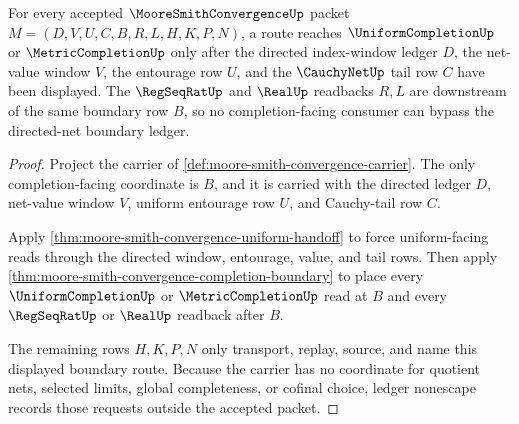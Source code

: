 \begin{theorem}
\label{thm:moore-smith-convergence-boundary-scope}
For every accepted $\MooreSmithConvergenceUp$ packet $M=(D,V,U,C,B,R,L,H,K,P,N)$, a route reaches $\UniformCompletionUp$ or $\MetricCompletionUp$ only after the directed index-window ledger $D$, the net-value window $V$, the entourage row $U$, and the $\CauchyNetUp$ tail row $C$ have been displayed. The $\RegSeqRatUp$ and $\RealUp$ readbacks $R,L$ are downstream of the same boundary row $B$, so no completion-facing consumer can bypass the directed-net boundary ledger.
\end{theorem}
\begin{proof}
Project the carrier of \autoref{def:moore-smith-convergence-carrier}. The only completion-facing coordinate is $B$, and it is carried with the directed ledger $D$, net-value window $V$, uniform entourage row $U$, and Cauchy-tail row $C$.

Apply \autoref{thm:moore-smith-convergence-uniform-handoff} to force uniform-facing reads through the directed window, entourage, value, and tail rows. Then apply \autoref{thm:moore-smith-convergence-completion-boundary} to place every $\UniformCompletionUp$ or $\MetricCompletionUp$ read at $B$ and every $\RegSeqRatUp$ or $\RealUp$ readback after $B$.

The remaining rows $H,K,P,N$ only transport, replay, source, and name this displayed boundary route. Because the carrier has no coordinate for quotient nets, selected limits, global completeness, or cofinal choice, ledger nonescape records those requests outside the accepted packet.
\end{proof}

